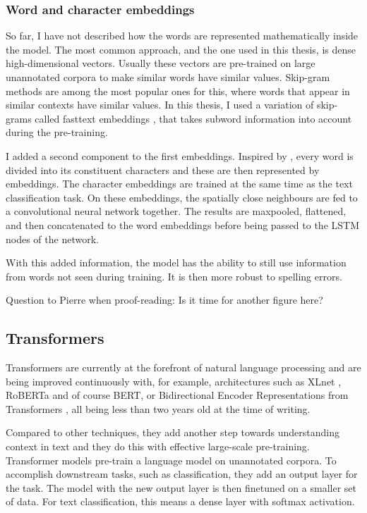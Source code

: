 \documentclass[nofilelist]{cslthse-msc}
\begin{document}
\subsubsection{Word and character embeddings}

So far, I have not described how the words are represented mathematically inside the model. The most common approach, and the one used in this thesis, is dense high-dimensional vectors. Usually these vectors are pre-trained on large unannotated corpora to make similar words have similar values. Skip-gram methods \citep{mikolov2013efficient} are among the most popular ones for this, where words that appear in similar contexts have similar values. In this thesis, I used  a variation of skip-grams called fasttext embeddings \citet{bojanowski2017enriching}, that takes subword information into account during the pre-training.

I added a second component to the first embeddings. Inspired by \citet{DBLP:journals/corr/ChiuN15}, every word is divided into its constituent characters and these are then represented by embeddings. The character embeddings are trained at the same time as the text classification task. On these embeddings, the spatially close neighbours are fed to a convolutional neural network together. The results are maxpooled, flattened, and then concatenated to the word embeddings before being passed to the LSTM nodes of the network. 

With this added information, the model has the ability to still use information from words not seen during training. It is then more robust to spelling errors.

Question to Pierre when proof-reading: Is it time for another figure here?

\subsection{Transformers}

Transformers are currently at the forefront of natural language processing and are being improved continuously with, for example, architectures such as XLnet \citep{DBLP:journals/corr/abs-1906-08237}, RoBERTa \citep{DBLP:journals/corr/abs-1907-11692} and of course BERT, or Bidirectional Encoder Representations from Transformers \citep{DBLP:journals/corr/abs-1810-04805}, all being less than two years old at the time of writing. 

Compared to other techniques, they add another step towards understanding context in text and they do this with effective large-scale pre-training. Transformer models pre-train a language model on unannotated corpora. To accomplish downstream tasks, such as classification, they add an output layer for the task. The model with the new output layer is then finetuned on a smaller set of data. For text classification, this means a dense layer with softmax activation.
\end{document}
